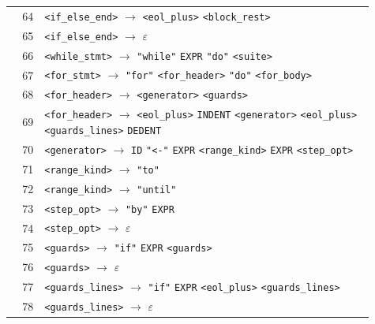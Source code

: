 \documentclass[11pt,a4paper]{article}
\begin{document}
\begin{longtable}{@{}r@{\quad}>{\raggedright\arraybackslash}p{0.91\linewidth}@{}}
64 & \texttt{\textless{}if\_else\_end\textgreater{}} $\rightarrow$ \texttt{\textless{}eol\_plus\textgreater{}} \texttt{\textless{}block\_rest\textgreater{}} \\
65 & \texttt{\textless{}if\_else\_end\textgreater{}} $\rightarrow$ $\varepsilon$ \\
66 & \texttt{\textless{}while\_stmt\textgreater{}} $\rightarrow$ \texttt{"while"} \texttt{EXPR} \texttt{"do"} \texttt{\textless{}suite\textgreater{}} \\
67 & \texttt{\textless{}for\_stmt\textgreater{}} $\rightarrow$ \texttt{"for"} \texttt{\textless{}for\_header\textgreater{}} \texttt{"do"} \texttt{\textless{}for\_body\textgreater{}} \\
68 & \texttt{\textless{}for\_header\textgreater{}} $\rightarrow$ \texttt{\textless{}generator\textgreater{}} \texttt{\textless{}guards\textgreater{}} \\
69 & \texttt{\textless{}for\_header\textgreater{}} $\rightarrow$ \texttt{\textless{}eol\_plus\textgreater{}} \texttt{INDENT} \texttt{\textless{}generator\textgreater{}} \texttt{\textless{}eol\_plus\textgreater{}} \texttt{\textless{}guards\_lines\textgreater{}} \texttt{DEDENT} \\
70 & \texttt{\textless{}generator\textgreater{}} $\rightarrow$ \texttt{ID} \texttt{"\textless{}-"} \texttt{EXPR} \texttt{\textless{}range\_kind\textgreater{}} \texttt{EXPR} \texttt{\textless{}step\_opt\textgreater{}} \\
71 & \texttt{\textless{}range\_kind\textgreater{}} $\rightarrow$ \texttt{"to"} \\
72 & \texttt{\textless{}range\_kind\textgreater{}} $\rightarrow$ \texttt{"until"} \\
73 & \texttt{\textless{}step\_opt\textgreater{}} $\rightarrow$ \texttt{"by"} \texttt{EXPR} \\
74 & \texttt{\textless{}step\_opt\textgreater{}} $\rightarrow$ $\varepsilon$ \\
75 & \texttt{\textless{}guards\textgreater{}} $\rightarrow$ \texttt{"if"} \texttt{EXPR} \texttt{\textless{}guards\textgreater{}} \\
76 & \texttt{\textless{}guards\textgreater{}} $\rightarrow$ $\varepsilon$ \\
77 & \texttt{\textless{}guards\_lines\textgreater{}} $\rightarrow$ \texttt{"if"} \texttt{EXPR} \texttt{\textless{}eol\_plus\textgreater{}} \texttt{\textless{}guards\_lines\textgreater{}} \\
78 & \texttt{\textless{}guards\_lines\textgreater{}} $\rightarrow$ $\varepsilon$ \\

\end{longtable}
\end{document}
